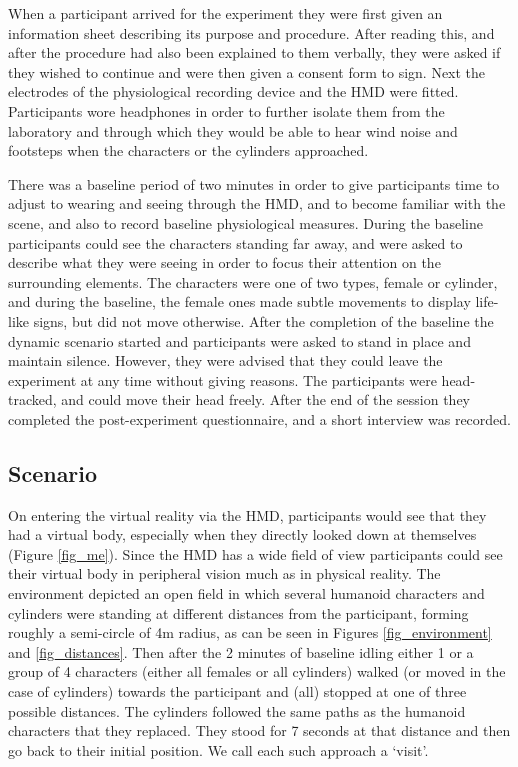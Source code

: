 \documentclass[
		twoside,openright,titlepage,numbers=noenddot,manychapters,
		headinclude,%
                footinclude=false,cleardoublepage=empty,
                BCOR=5mm,
		fontsize=11pt, %
                 enabledeprecatedfontcommands]{scrreprt}
\begin{document}
When a participant arrived for the experiment they were first given an information sheet describing its purpose and procedure. After reading this, and after the procedure had also been explained to them verbally, they were asked if they wished to continue and were then given a consent form to sign. Next the electrodes of the physiological recording device and the HMD were fitted. Participants wore headphones in order to further isolate them from the laboratory and through which they would be able to hear wind noise and footsteps when the characters or the cylinders approached. 

There was a baseline period of two minutes in order to give participants time to adjust to wearing and seeing through the HMD, and to become familiar with the scene, and also to record baseline physiological measures. During the baseline participants could see the characters standing far away, and were asked to describe what they were seeing in order to focus their attention on the surrounding elements. The characters were one of two types, female or cylinder, and during the baseline, the female ones made subtle movements to display life-like signs, but did not move otherwise. After the completion of the baseline the dynamic scenario started and participants were asked to stand in place and maintain silence. However, they were advised that they could leave the experiment at any time without giving reasons. The participants were head-tracked, and could move their head freely. After the end of the session they completed the post-experiment questionnaire, and a short interview was recorded. 

\subsection{Scenario}
\label{the_scenario}
On entering the virtual reality via the HMD, participants would see that they had a virtual body, especially when they directly looked down at themselves (Figure \ref{fig_me}). Since the HMD has a wide field of view participants could see their virtual body in peripheral vision much as in physical reality.  The environment depicted an open field in which several humanoid characters and cylinders were standing at different distances from the participant, forming roughly a semi-circle of 4m radius, as can be seen in Figures \ref{fig_environment} and \ref{fig_distances}. Then after the 2 minutes of baseline idling either 1 or a group of 4 characters (either all females or all cylinders) walked (or moved in the case of cylinders) towards the participant and (all) stopped at one of three possible distances. The cylinders followed the same paths as the humanoid characters that they replaced. They stood for 7 seconds at that distance and then go back to their initial position. We call each such approach a `visit'. 
\end{document}
